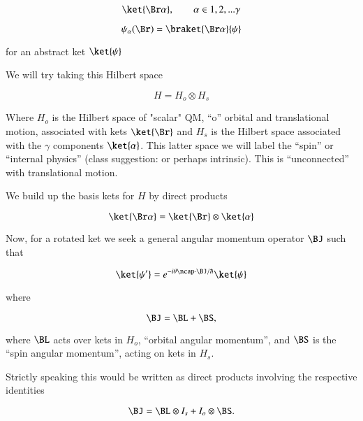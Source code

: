 \begin{equation}\label{eqn:qmTwoL13:70}
\ket{\Br \alpha}, \qquad \alpha \in 1, 2, ... \gamma
\end{equation}

\begin{equation}\label{eqn:qmTwoL13:90}
\psi_\alpha(\Br) = \braket{ \Br\alpha}{\psi}
\end{equation}

for an abstract ket $\ket{\psi}$

We will try taking this Hilbert space

\begin{equation}\label{eqn:qmTwoL13:110}
H = H_o \otimes H_s
\end{equation}

Where $H_o$ is the Hilbert space of "scalar" QM, ``o'' orbital and translational motion, associated with kets $\ket{\Br}$ and $H_s$ is the Hilbert space associated with the $\gamma$ components $\ket{\alpha}$.  This latter space we will label the ``spin'' or ``internal physics'' (class suggestion: or perhaps intrinsic).  This is ``unconnected'' with translational motion.

We build up the basis kets for $H$ by direct products

\begin{equation}\label{eqn:qmTwoL13:130}
\ket{\Br \alpha} = \ket{\Br} \otimes \ket{\alpha}
\end{equation}

Now, for a rotated ket we seek a general angular momentum operator $\BJ$ such that 

\begin{equation}\label{eqn:qmTwoL13:150}
\ket{\psi'} = e^{-i \theta \ncap \cdot \BJ/\hbar} \ket{\psi}
\end{equation}

where 

\begin{equation}\label{eqn:qmTwoL13:170}
\BJ = \BL + \BS,
\end{equation}

where $\BL$ acts over kets in $H_o$, ``orbital angular momentum'', and $\BS$ is the ``spin angular momentum'', acting on kets in $H_s$.

Strictly speaking this would be written as direct products involving the respective identities

\begin{equation}\label{eqn:qmTwoL13:190}
\BJ = \BL \otimes I_s + I_o \otimes \BS.
\end{equation}

